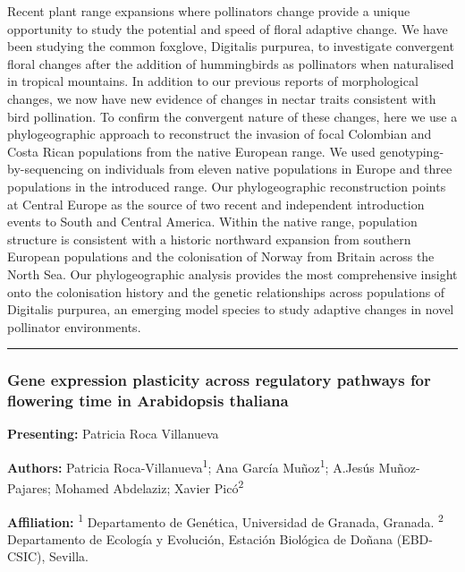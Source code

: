 \documentclass[
  letterpaper,
  DIV=11,
  numbers=noendperiod]{scrartcl}
\begin{document}
Recent plant range expansions where pollinators change provide a unique
opportunity to study the potential and speed of floral adaptive change.
We have been studying the common foxglove, Digitalis purpurea, to
investigate convergent floral changes after the addition of hummingbirds
as pollinators when naturalised in tropical mountains. In addition to
our previous reports of morphological changes, we now have new evidence
of changes in nectar traits consistent with bird pollination. To confirm
the convergent nature of these changes, here we use a phylogeographic
approach to reconstruct the invasion of focal Colombian and Costa Rican
populations from the native European range. We used
genotyping-by-sequencing on individuals from eleven native populations
in Europe and three populations in the introduced range. Our
phylogeographic reconstruction points at Central Europe as the source of
two recent and independent introduction events to South and Central
America. Within the native range, population structure is consistent
with a historic northward expansion from southern European populations
and the colonisation of Norway from Britain across the North Sea. Our
phylogeographic analysis provides the most comprehensive insight onto
the colonisation history and the genetic relationships across
populations of Digitalis purpurea, an emerging model species to study
adaptive changes in novel pollinator environments.

\begin{center}\rule{0.5\linewidth}{0.5pt}\end{center}

\subsubsection{Gene expression plasticity across regulatory pathways for
flowering time in Arabidopsis
thaliana}\label{gene-expression-plasticity-across-regulatory-pathways-for-flowering-time-in-arabidopsis-thaliana}

\textbf{Presenting:} Patricia Roca Villanueva

\textbf{Authors:} Patricia Roca-Villanueva\textsuperscript{1}; Ana
García Muñoz\textsuperscript{1}; A.Jesús Muñoz-Pajares; Mohamed
Abdelaziz; Xavier Picó\textsuperscript{2}

\textbf{Affiliation:} \textsuperscript{1} Departamento de Genética,
Universidad de Granada, Granada. \textsuperscript{2} Departamento de
Ecología y Evolución, Estación Biológica de Doñana (EBD-CSIC), Sevilla.
\end{document}
